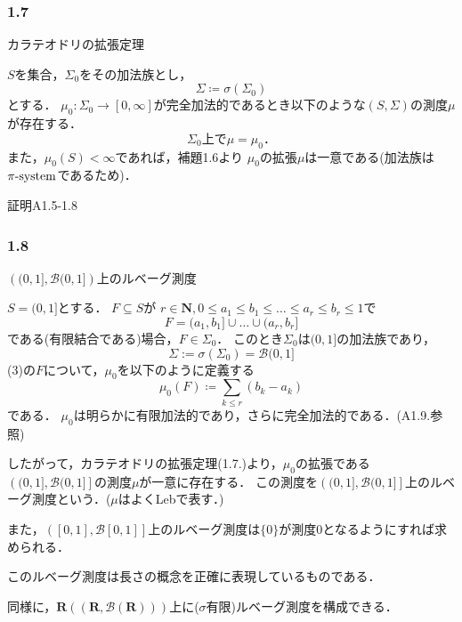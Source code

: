 \documentclass{jsarticle}
\begin{document}
\subsubsection*{1.7}
カラテオドリの拡張定理

$S$を集合，$\Sigma_0$をその加法族とし，
\begin{equation}
    \Sigma\coloneqq\sigma(\Sigma_0) \nonumber
\end{equation}
とする．
$\mu_0:\Sigma_0\to[0,\infty]$が完全加法的であるとき以下のような$(S,\Sigma)$の測度$\mu$が存在する．
\begin{equation}
    \Sigma_0 上で \mu=\mu_0 ． \nonumber
\end{equation}
また，$\mu_0(S)<\infty$であれば，補題1.6より
$\mu_0$の拡張$\mu$は一意である(加法族は$\pi{\rm \text{-}system}$であるため)．

証明A1.5-1.8

\subsubsection*{1.8}
$\left( (0,1] , \mathcal{B}(0,1] \right)$上のルベーグ測度

$S=(0,1]$とする．
$F\subseteq S$が
$r\in\mathbf{N},0\leq a_1\leq b_1\leq\dots\leq a_r\leq b_r\leq 1$で
\begin{equation}
    F=(a_1,b_1]\cup\dots\cup(a_r,b_r]
\end{equation}
である(有限結合である)場合，$F\in\Sigma_0$．
このとき$\Sigma_0$は$(0,1]$の加法族であり，
\begin{equation}
    \Sigma:=\sigma(\Sigma_0)=\mathcal{B}(0,1] \nonumber
\end{equation}
(3)の$F$について，$\mu_0$を以下のように定義する
\begin{equation}
    \mu_0(F)\coloneqq\sum_{k\leq r}(b_k-a_k) \nonumber
\end{equation}
である．
$\mu_0$は明らかに有限加法的であり，さらに完全加法的である．(A1.9.参照)

したがって，カラテオドリの拡張定理(1.7.)より，$\mu_0$の拡張である
$\left( (0,1],\mathcal{B}(0,1] \right]$の測度$\mu$が一意に存在する．
この測度を$\left( (0,1],\mathcal{B}(0,1] \right]$上のルベーグ測度という．($\mu$はよくLebで表す．)

また，$\left( [0,1],\mathcal{B}[0,1] \right]$上のルベーグ測度は$\{0\}$が測度0となるようにすれば求められる．

このルベーグ測度は長さの概念を正確に表現しているものである．

同様に，$\mathbf{R} ((\mathbf{R}, \mathcal{B}(\mathbf{R})))$上に($\sigma$有限)ルベーグ測度を構成できる．
\end{document}
